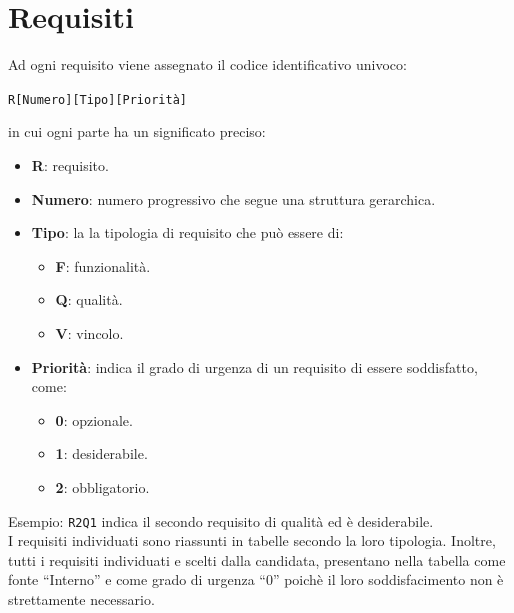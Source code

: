 \section{Requisiti}	\label{requisiti}
Ad ogni requisito viene assegnato il codice identificativo univoco:
	\begin{center}
		\texttt{R[Numero][Tipo][Priorità]}
	\end{center}
	in cui ogni parte ha un significato preciso:
	\begin{itemize}
		\item \textbf{R}: requisito.
		\item \textbf{Numero}: numero progressivo che segue una struttura gerarchica.
		\item \textbf{Tipo}: la la tipologia di requisito che può essere di:
		\begin{itemize}
			\item \textbf{F}: funzionalità.
			\item \textbf{Q}: qualità.
			\item \textbf{V}: vincolo.
		\end{itemize}
		\item \textbf{Priorità}: indica il grado di urgenza di un requisito di essere soddisfatto, come:
		\begin{itemize}
			\item \textbf{0}: opzionale.
			\item \textbf{1}: desiderabile.
			\item \textbf{2}: obbligatorio.
		\end{itemize}
	\end{itemize}

	Esempio: \texttt{R2Q1} indica il secondo requisito di qualità ed è desiderabile. \\

	I requisiti individuati sono riassunti in tabelle secondo la loro tipologia.
	Inoltre, tutti i requisiti individuati e scelti dalla candidata, presentano nella tabella come fonte ``Interno'' e come grado di urgenza ``0'' poichè il loro soddisfacimento non è strettamente necessario.





